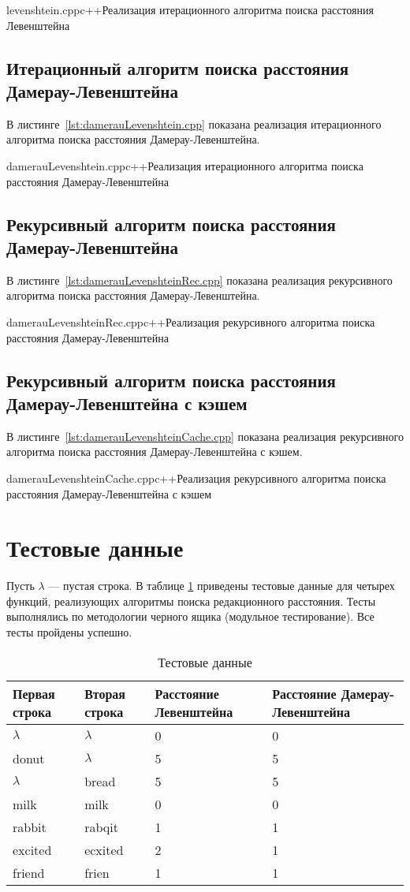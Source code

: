 {levenshtein.cpp}{c++}{Реализация итерационного алгоритма поиска расстояния Левенштейна}

\subsection{Итерационный алгоритм поиска расстояния Дамерау-Левенштейна}

В листинге~\ref{lst:damerauLevenshtein.cpp} показана реализация итерационного алгоритма поиска расстояния Дамерау-Левенштейна.

{damerauLevenshtein.cpp}{c++}{Реализация итерационного алгоритма поиска расстояния Дамерау-Левенштейна}

\subsection{Рекурсивный алгоритм поиска расстояния Дамерау-Левенштейна}

В листинге~\ref{lst:damerauLevenshteinRec.cpp} показана реализация рекурсивного алгоритма поиска расстояния Дамерау-Левенштейна.

{damerauLevenshteinRec.cpp}{c++}{Реализация рекурсивного алгоритма поиска расстояния Дамерау-Левенштейна}

\subsection{Рекурсивный алгоритм поиска расстояния Дамерау-Левенштейна с кэшем}

В листинге~\ref{lst:damerauLevenshteinCache.cpp} показана реализация рекурсивного алгоритма поиска расстояния Дамерау-Левенштейна с кэшем.

{damerauLevenshteinCache.cpp}{c++}{Реализация рекурсивного алгоритма поиска расстояния Дамерау-Левенштейна с кэшем}

\section{Тестовые данные}

Пусть $\lambda$ --- пустая строка.  
В таблице \ref{tabular:testsdata} приведены тестовые данные для четырех функций, реализующих алгоритмы поиска редакционного расстояния. 
Тесты выполнялись по методологии черного ящика (модульное тестирование). 
Все тесты пройдены успешно.

\begin{table}[H]
\caption{Тестовые данные}
\label{tabular:testsdata}
\begin{tabular}{|p{4cm}|p{4cm}|p{3.5cm}|p{3.5cm}|}
\hline
\textbf{Первая строка} & \textbf{Вторая строка} & \textbf{Расстояние Левенштейна} & \textbf{Расстояние Дамерау-Левенштейна} \tabularnewline
\hline
$\lambda$ & $\lambda$ & 0 & 0
\tabularnewline
\hline
donut & $\lambda$ & 5 & 5
\tabularnewline
\hline
$\lambda$ & bread & 5 & 5
\tabularnewline
\hline
milk & milk & 0 & 0
\tabularnewline
\hline
rabbit & rabqit & 1 & 1
\tabularnewline
\hline
excited & ecxited & 2 & 1
\tabularnewline
\hline
friend & frien & 1 & 1
\tabularnewline
\hline
\end{tabular}
\end{table}

